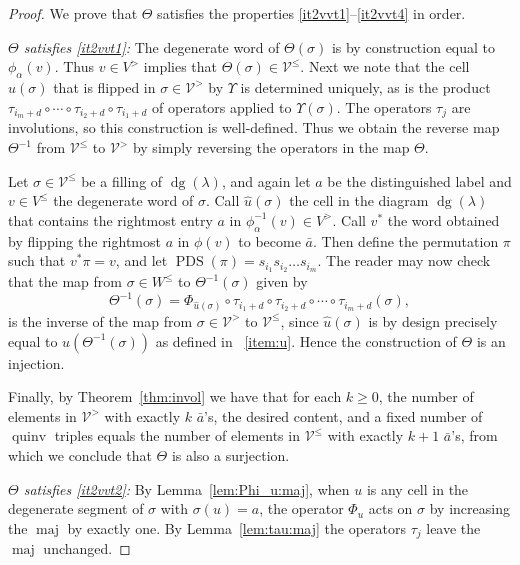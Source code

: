 \documentclass[11pt]{article}
\theoremstyle{definition}
\numberwithin{equation}{section}
\DeclareMathOperator{\PDS}{PDS}
\DeclareMathOperator{\dg}{dg}
\DeclareMathOperator{\maj}{maj}
\DeclareMathOperator{\quinv}{quinv}
\begin{document}
\begin{proof}
We prove that $\Theta$ satisfies the properties \ref{it2vvt1}--\ref{it2vvt4} in order. 

\emph{$\Theta$ satisfies \ref{it2vvt1}:} The degenerate word of $\Theta(\sigma)$ is by construction equal to $\phi_\alpha(v)$. Thus $v\in V^{>}$ implies that $\Theta(\sigma)\in \mathcal{V}^{\leq}$. Next we note that the cell $u(\sigma)$ that is flipped in $\sigma\in \mathcal{V}^{>}$ by $\Upsilon$ is determined uniquely, as is the product $ \tau_{i_m+d}\circ\cdots\circ \tau_{i_2+d} \circ \tau_{i_1+d}$ of operators applied to $\Upsilon(\sigma)$. The operators $\tau_j$ are involutions, so this construction is well-defined. Thus we obtain the reverse map $\Theta^{-1}$ from $\mathcal{V}^{\leq}$ to $\mathcal{V}^{>}$ by simply reversing the operators in the map $\Theta$. 

Let $\sigma\in \mathcal{V}^{\leq}$ be a filling of $\dg(\lambda)$, and again let $a$ be the distinguished label and $v\in V^{\leq}$ the degenerate word of $\sigma$. Call $\widehat{u}(\sigma)$ the cell in the diagram $\dg(\lambda)$ that contains the rightmost entry $a$ in $\phi^{-1}_\alpha(v)\in V^>$. Call $v^{\ast}$ the word obtained by flipping the rightmost $a$ in $\phi(v)$ to become $\bar{a}$. Then define the permutation $\pi$ such that $v^{\ast}\pi=v$, and let $\PDS(\pi)=s_{i_1}s_{i_2}\ldots s_{i_m}$. The reader may now check that the map from $\sigma\in W^{\leq}$ to $\Theta^{-1}(\sigma)$ given by
\[
\Theta^{-1}(\sigma) = \Phi_{\widehat{u}(\sigma)}\circ \tau_{i_1+d}\circ \tau_{i_2+d} \circ\cdots\circ \tau_{i_m+d}(\sigma),
\]
is the inverse of the map from $\sigma\in \mathcal{V}^{>}$ to $\mathcal{V}^{\leq}$, since $\widehat{u}(\sigma)$ is by design precisely equal to $u(\Theta^{-1}(\sigma))$ as defined in ~\ref{item:u}. Hence the construction of $\Theta$ is an injection.

Finally, by Theorem~\ref{thm:invol} we have that for each $k\geq 0$, the number of elements in $\mathcal{V}^{>}$ with exactly $k$ $\bar{a}$'s, the desired content, and a fixed number of $\quinv$ triples equals the number of elements in $\mathcal{V}^{\leq}$ with exactly $k+1$ $\bar{a}$'s, from which we conclude that $\Theta$ is also a surjection.

\emph{$\Theta$ satisfies \ref{it2vvt2}:}
By Lemma~\ref{lem:Phi_u:maj}, when $u$ is any cell in the degenerate segment of $\sigma$ with $\sigma(u)=a$, the operator $\Phi_u$ acts on $\sigma$ by increasing the $\maj$ by exactly one. By Lemma~\ref{lem:tau:maj} the operators $\tau_j$ leave the $\maj$ unchanged.


\end{proof}
\end{document}
